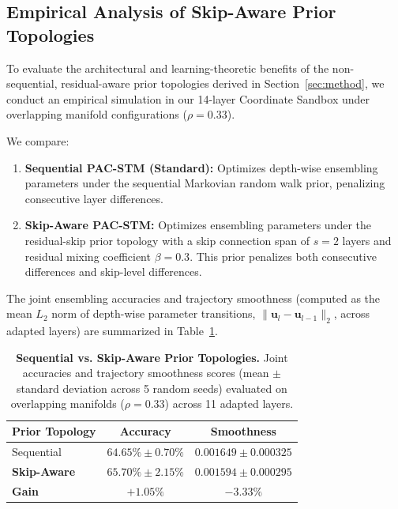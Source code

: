 \subsection{Empirical Analysis of Skip-Aware Prior Topologies}
\label{subsec:skip_prior_eval}
To evaluate the architectural and learning-theoretic benefits of the non-sequential, residual-aware prior topologies derived in Section~\ref{sec:method}, we conduct an empirical simulation in our 14-layer Coordinate Sandbox under overlapping manifold configurations ($\rho = 0.33$). 

We compare:
\begin{enumerate}
    \item \textbf{Sequential PAC-STM (Standard):} Optimizes depth-wise ensembling parameters under the sequential Markovian random walk prior, penalizing consecutive layer differences.
    \item \textbf{Skip-Aware PAC-STM:} Optimizes ensembling parameters under the residual-skip prior topology with a skip connection span of $s=2$ layers and residual mixing coefficient $\beta = 0.3$. This prior penalizes both consecutive differences and skip-level differences.
\end{enumerate}

The joint ensembling accuracies and trajectory smoothness (computed as the mean $L_2$ norm of depth-wise parameter transitions, $\| \mathbf{u}_l - \mathbf{u}_{l-1} \|_2$, across adapted layers) are summarized in Table~\ref{tab:skip_prior_results}.

\begin{table}[h]
\caption{\textbf{Sequential vs. Skip-Aware Prior Topologies.} Joint accuracies and trajectory smoothness scores (mean $\pm$ standard deviation across 5 random seeds) evaluated on overlapping manifolds ($\rho = 0.33$) across 11 adapted layers.}
\label{tab:skip_prior_results}
\begin{center}
\begin{footnotesize}
\begin{sc}
\setlength{\tabcolsep}{1.5pt}
\begin{tabular}{lcc}
\toprule
Prior Topology & Accuracy & Smoothness \\
\midrule
\textnormal{Sequential} & $64.65\% \pm 0.70\%$ & $0.001649 \pm 0.000325$ \\
\textnormal{\textbf{Skip-Aware}} & $\mathbf{65.70\% \pm 2.15\%}$ & $\mathbf{0.001594 \pm 0.000295}$ \\
\midrule
\textnormal{\textbf{Gain}} & $\mathbf{+1.05\%}$ & $\mathbf{-3.33\%}$ \\
\bottomrule
\end{tabular}
\end{sc}
\end{footnotesize}
\end{center}
\vskip -0.1in
\end{table}

